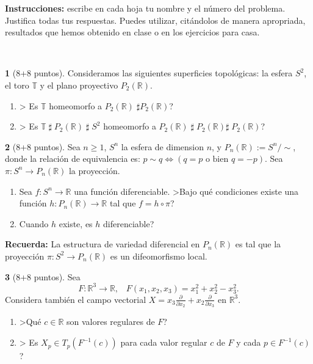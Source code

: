 \documentclass[12pt,a4paper]{report}
\theoremstyle{definition}
\newtheorem{ex}{}
\newcommand{\pd}[1]{\frac{\partial}{\partial #1}} %
\newcommand{\TT}{\ensuremath{\mathbb T}}
\newcommand{\RR}{\ensuremath{\mathbb R}}
\begin{document}
\noindent
\textsf{{\bf \sffamily  Instrucciones:} escribe en cada hoja tu nombre y el n\'umero del problema.\\
Justifica todas tus respuestas.
Puedes utilizar, cit\'andolos de manera apropriada, resultados que hemos obtenido en clase o en los ejercicios para casa.    \vspace{-2mm}}

 \noindent
\hrulefill{}\\
 
\begin{ex}[8+8 puntos]
Consideramos las siguientes superficies topol\'ogicas: la esfera $S^2$, el toro $\TT$ y el plano proyectivo $P_2(\RR)$.    
\begin{enumerate}  \item > Es   $\TT$   homeomorfo a $P_2(\RR)\; \sharp P_2(\RR)$?
\item > Es   $\TT \; \sharp \; P_2(\RR) \; \sharp \; S^2$   homeomorfo a $P_2(\RR)\; \sharp \;P_2(\RR) \sharp \; P_2(\RR)$?
\end{enumerate}
 \end{ex}

\vspace{0.8cm}

\begin{ex} [8+8 puntos]
Sea $n\ge 1$, $S^n$ la esfera de dimension $n$, y  $P_n(\RR):=S^n/\sim$, donde la relaci\'on de equivalencia  es: $p \sim q \Leftrightarrow (q=p \text{ o bien } q=-p)$. Sea $\pi \colon S^n \to P_n(\RR)$ la proyecci\'on. 
\begin{enumerate} 
\item 
 Sea $f\colon S^n \to \RR$ una funci\'on diferenciable. >Bajo qu\'e condiciones existe una funci\'on $h \colon P_n(\RR) \to \RR$ tal que $f=h \circ \pi$?
\item Cuando $h$ existe, es $h$ diferenciable? 
\end{enumerate}
\textbf{Recuerda: }  La estructura de variedad diferencial en  $P_n(\RR)$ es tal que la proyecci\'on $\pi \colon S^2 \to P_n(\RR)$ es un difeomorfismo local.
\end{ex}

\vspace{0.8cm}

 \begin{ex}  [8+8 puntos]
 
Sea $$F \colon \RR^3 \to \RR,\;\;\; F(x_1,x_2,x_3)=x_1^2+x_2^2-x_3^2.$$ Considera tambi\'en el campo vectorial $X=x_3\pd{x_2}+x_2\pd{x_3}$ en $\RR^3$.
 
 \begin{enumerate}\item >Qu\'e  $c\in \RR$ son valores regulares de $F$?
\item > Es  $X_p\in T_p (F^{-1}(c))$ para cada valor regular $c$ de $F$ y cada $p\in 
 F^{-1}(c)$?
\end{enumerate}
\end{ex}
\end{document}
